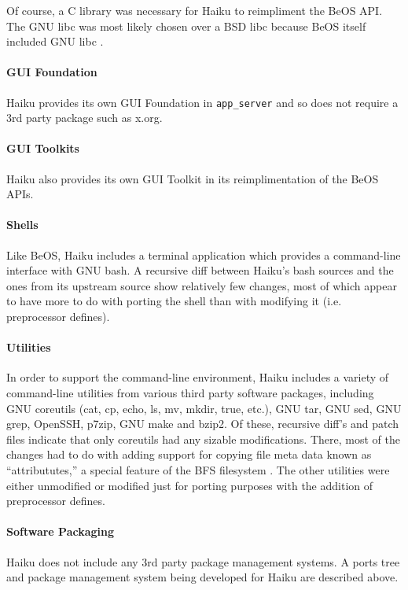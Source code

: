 \documentclass{article}
\begin{document}
Of course, a C library was necessary for Haiku to reimpliment the BeOS
API.  The GNU libc was most likely chosen over a BSD libc because BeOS
itself included GNU libc \cite{GlibCWiki}.

\paragraph{GUI Foundation}
Haiku provides its own GUI Foundation in \texttt{app\_server} and so
does not require a 3rd party package such as x.org.

\paragraph{GUI Toolkits}
Haiku also provides its own GUI Toolkit in its reimplimentation of the
BeOS APIs.

\paragraph{Shells}
Like BeOS, Haiku includes a terminal application which provides a
command-line interface with GNU bash.  A recursive diff between
Haiku's bash sources and the ones from its upstream source show
relatively few changes, most of which appear to have more to do with
porting the shell than with modifying it (i.e. preprocessor defines).

\paragraph{Utilities}
In order to support the command-line environment, Haiku includes a
variety of command-line utilities from various third party software
packages, including GNU coreutils (cat, cp, echo, ls, mv, mkdir, true,
etc.), GNU tar, GNU sed, GNU grep, OpenSSH, p7zip, GNU make and bzip2.
Of these, recursive diff's and patch files \cite{HaikuR1A3Src}
indicate that only coreutils had any sizable modifications.  There,
most of the changes had to do with adding support for copying file
meta data known as ``attribututes,'' a special feature of the BFS
filesystem \cite{BFSWiki}.  The other utilities were either unmodified
or modified just for porting purposes with the addition of
preprocessor defines.

\paragraph{Software Packaging}
Haiku does not include any 3rd party package management systems.  A
ports tree and package management system being developed for Haiku are
described above.
\end{document}
